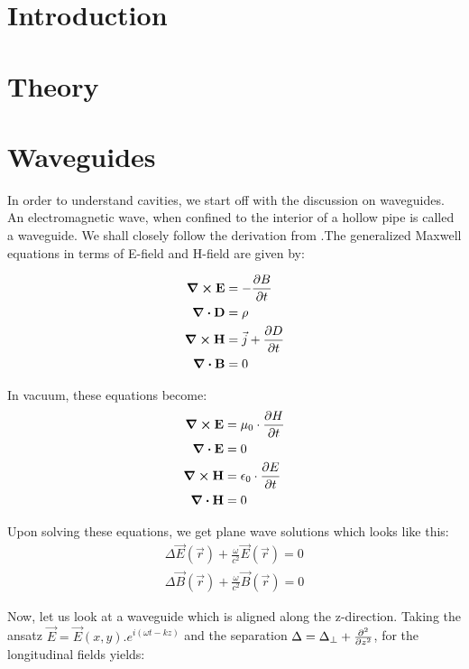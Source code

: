 \documentclass[a4paper]{article}
\numberwithin{equation}{section}
\begin{document}
\section{Introduction}



\section{Theory}


\section{Waveguides}
In order to understand cavities, we start off with the discussion on waveguides.
An electromagnetic wave, when confined to the interior of a hollow pipe is
called a waveguide. We shall closely follow the derivation from \cite{Switka22}.The
generalized Maxwell equations in terms of E-field and H-field are given by:

\begin{align}
		\curl {\vb{{E}}} &= - \pdv{{B}}{t} \\
		\div{\vb{D}} &= \rho \\
		\curl {\vb{{H}}} &= \vec{j} + \pdv{{D}}{t} \\
		\div{\vb{{B}}} &= 0 
\end{align}

In vacuum, these equations become: 
\begin{align}
		\curl {\vb{{E}}} &= \mu_0 \cdot \pdv{{H}}{t} \\ 
		\div{\vb{{E}}} &= 0 \\
		\curl {\vb{{H}}} &= \epsilon_{0} \cdot \pdv{{E}}{t} \\
		\div{\vb{{H}}} &= 0
\end{align}

Upon solving these equations, we get plane wave solutions which looks like this: 
\begin{align*}
		\Delta \vec{E}\left(\vec{r}\right) + \frac{\omega}{c^2} \vec{E}\left(\vec{r}\right) = 0 \\
		\Delta \vec{B}\left(\vec{r}\right) + \frac{\omega}{c^2} \vec{B}\left(\vec{r}\right) = 0 
\end{align*}

Now, let us look at a waveguide which is aligned along the z-direction. Taking
the ansatz $\vec{E} = \vec{E}(x,y).e^{i(\omega t -kz)}$ and the separation
$\Delta = \Delta_{\perp} + \pdv[2]{}{z}$, for the longitudinal fields yields: 
\end{document}

